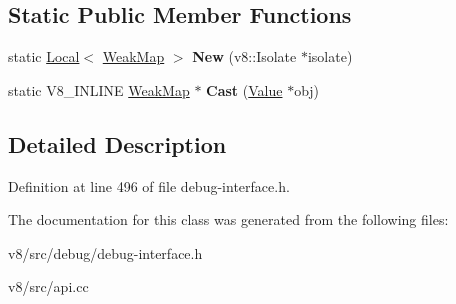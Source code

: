\subsection*{Static Public Member Functions}
\begin{DoxyCompactItemize}
\item 
\mbox{\label{classv8_1_1debug_1_1WeakMap_acc91ea6e6f8b4787d7a0ef4e97a9580a}} 
static \mbox{\hyperlink{classv8_1_1Local}{Local}}$<$ \mbox{\hyperlink{classv8_1_1debug_1_1WeakMap}{Weak\+Map}} $>$ {\bfseries New} (v8\+::\+Isolate $\ast$isolate)
\item 
\mbox{\label{classv8_1_1debug_1_1WeakMap_ac9edf056019f7a37d2a314559a80b42a}} 
static V8\+\_\+\+I\+N\+L\+I\+NE \mbox{\hyperlink{classv8_1_1debug_1_1WeakMap}{Weak\+Map}} $\ast$ {\bfseries Cast} (\mbox{\hyperlink{classv8_1_1Value}{Value}} $\ast$obj)
\end{DoxyCompactItemize}


\subsection{Detailed Description}


Definition at line 496 of file debug-\/interface.\+h.



The documentation for this class was generated from the following files\+:\begin{DoxyCompactItemize}
\item 
v8/src/debug/debug-\/interface.\+h\item 
v8/src/api.\+cc\end{DoxyCompactItemize}
